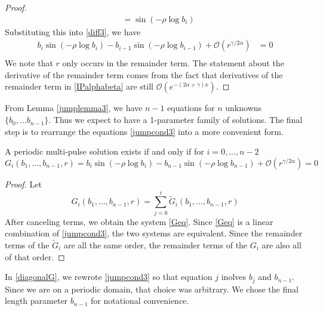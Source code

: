 \documentclass[thesis.tex]{subfiles}
\begin{document}
\begin{lemma}
\begin{proof}
\begin{align*}
&= \sin \left( -\rho \log b_i \right) 
\end{align*}
Substituting this into \eqref{diff3}, we have
\begin{align*}
b_i \sin \left( -\rho \log b_i \right) - b_{i-1} \sin \left( -\rho \log b_{i-1} \right) + \mathcal{O}(r^{\gamma / 2 \alpha}) &= 0 \\
\end{align*}
We note that $r$ only occurs in the remainder term. The statement about the derivative of the remainder term comes from the fact that derivatives of the remainder term in \eqref{IPalphabeta} are still $\mathcal{O}(e^{-(2 \alpha + \gamma) x})$.
\end{proof}
\end{lemma}

From Lemma \ref{jumplemma3}, we have $n-1$ equations for $n$ unknowns $\{ b_0, \dots b_{n-1} \}$. Thus we expect to have a 1-parameter family of solutions. The final step is to rearrange the equations \eqref{jumpcond3} into a more convenient form. 


\begin{lemma}\label{diagonalG}
A periodic multi-pulse solution exists if and only if for $i = 0, \dots, n-2$
\begin{equation}\label{Geq}
G_i(b_1, \dots, b_{n-1}, r) = b_i \sin \left( -\rho \log b_i \right) - b_{n-1} \sin \left( -\rho \log b_{n-1} \right) + \mathcal{O}(r^{\gamma / 2 \alpha}) = 0
\end{equation}

\begin{proof}
Let \begin{equation}\label{Gidef}
G_i(b_1, \dots, b_{n-1}, r) = \sum_{j = 0}^i \tilde{G}_i(b_1, \dots, b_{n-1}, r)
\end{equation}
After canceling terms, we obtain the system \eqref{Geq}. Since \eqref{Geq} is a linear combination of \eqref{jumpcond3}, the two systems are equivalent. Since the remainder terms of the $\tilde{G}_i$ are all the same order, the remainder terms of the $G_i$ are also all of that order.
\end{proof}
\end{lemma}

\begin{remark}
In \cref{diagonalG}, we rewrote \cref{jumpcond3} so that equation $j$ inolves $b_j$ and $b_{n-1}$. Since we are on a periodic domain, that choice was arbitrary. We chose the final length parameter $b_{n-1}$ for notational convenience.
\end{remark}
\end{document}

